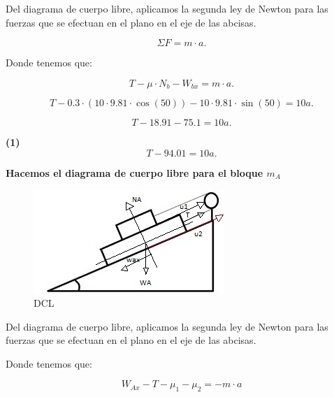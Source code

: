 \documentclass[a4paper,12pt]{article} %
\begin{document}
\begin{justify}
    Del diagrama de cuerpo libre, aplicamos la segunda ley de Newton para las fuerzas que se efectuan en el plano en el eje de las abcisas.
\end{justify}

\[\Sigma F = m \cdot a.\]

\begin{justify}
    Donde tenemos que:
\end{justify}

\[T - \mu \cdot N_b - W_{bx} = m \cdot a. \]

\[T - 0.3 \cdot \left(10 \cdot 9.81 \cdot \cos (50)\right) - 10 \cdot 9.81 \cdot \sin (50) = 10a.\]

\[T - 18.91 - 75.1 = 10a.\]

\textbf{(1)} \[ T - 94.01 = 10a.\]

\newpage

\begin{justify}
    \textbf{Hacemos el diagrama de cuerpo libre para el bloque \(m_A\)}
\end{justify}

\begin{figure}[h!]
    \centering
    \includegraphics[width=\textwidth]{Bloque a.jpg}
    \caption{DCL}
\end{figure}

\begin{justify}
    Del diagrama de cuerpo libre, aplicamos la segunda ley de Newton para las fuerzas que se efectuan en el plano en el eje de las abcisas.
\end{justify}

\begin{justify}
    Donde tenemos que:
\end{justify}


\[W_{Ax} - T - \mu_1 - \mu_2 = - m\cdot a\]
\end{document}
